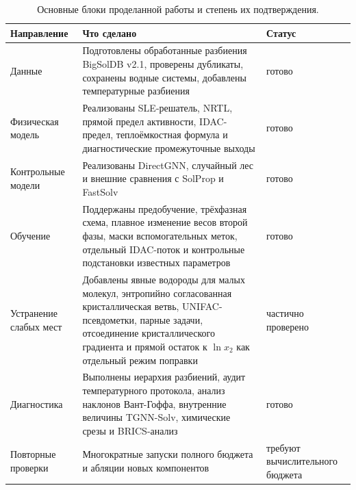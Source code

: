 \documentclass[11pt]{article}
\theoremstyle{definition}
\begin{document}
\begin{table}[!htbp]
\centering
\caption{Основные блоки проделанной работы и степень их подтверждения.}
\label{tab:app-implemented-work}
\small
\begin{tabularx}{\textwidth}{P{0.22\textwidth}Y P{0.18\textwidth}}
\toprule
Направление & Что сделано & Статус \\
\midrule
Данные & Подготовлены обработанные разбиения BigSolDB v2.1, проверены дубликаты, сохранены водные системы, добавлены температурные разбиения & готово \\
Физическая модель & Реализованы SLE-решатель, NRTL, прямой предел активности, IDAC-предел, теплоёмкостная формула и диагностические промежуточные выходы & готово \\
Контрольные модели & Реализованы DirectGNN, случайный лес и внешние сравнения с SolProp и FastSolv & готово \\
Обучение & Поддержаны предобучение, трёхфазная схема, плавное изменение весов второй фазы, маски вспомогательных меток, отдельный IDAC-поток и контрольные подстановки известных параметров & готово \\
Устранение слабых мест & Добавлены явные водороды для малых молекул, энтропийно согласованная кристаллическая ветвь, UNIFAC-псевдометки, парные задачи, отсоединение кристаллического градиента и прямой остаток к \(\ln x_2\) как отдельный режим поправки & частично проверено \\
Диагностика & Выполнены иерархия разбиений, аудит температурного протокола, анализ наклонов Вант-Гоффа, внутренние величины TGNN-Solv, химические срезы и BRICS-анализ & готово \\
Повторные проверки & Многократные запуски полного бюджета и абляции новых компонентов & требуют вычислительного бюджета \\
\bottomrule
\end{tabularx}
\end{table}
\end{document}
